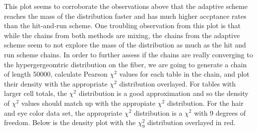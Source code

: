\documentclass{phd}\usepackage[]{graphicx}\usepackage[]{color}
\makeatletter
\newenvironment{kframe}{%
 \def\at@end@of@kframe{}%
 \ifinner\ifhmode%
  \def\at@end@of@kframe{\end{minipage}}%
  \begin{minipage}{\columnwidth}%
 \fi\fi%
 \def\FrameCommand##1{\hskip\@totalleftmargin \hskip-\fboxsep
 \colorbox{shadecolor}{##1}\hskip-\fboxsep
     \hskip-\linewidth \hskip-\@totalleftmargin \hskip\columnwidth}%
 \MakeFramed {\advance\hsize-\width
   \@totalleftmargin\z@ \linewidth\hsize
   \@setminipage}}%
 {\par\unskip\endMakeFramed%
 \at@end@of@kframe}
\newenvironment{knitrout}{}{} %
\makeatother
\begin{document}
\begin{knitrout}
\color{fgcolor}\begin{kframe}


{\ttfamily\noindent\bfseries\color{errorcolor}{\#\# Error in eval(lhs, parent, parent): object 'plot\_df2' not found}}\end{kframe}
\end{knitrout}

This plot seems to corroborate the observations above that the adaptive scheme reaches the mass of the distribution faster and has much higher accptance rates than the hit-and-run scheme. One troubling observation from this plot is that while the chains from both methods are mixing, the chains from the adaptive scheme seem to not explore the mass of the distribution as much as the hit and run scheme chains. In order to further assess if the chains are really converging to the hypergergeomtric distribution on the fiber, we are going to generate a chain of length 50000, calculate Pearson $\chi^2$ values for each table in the chain, and plot their density with the appropriate $\chi^2$ distribution overlayed. For tables with larger cell totals, the $\chi^2$ distribution is a good approximation and so the density of $\chi^2$ values should match up with the appropiate $\chi^2$ distribution. For the hair and eye color data set, the appropriate $\chi^2$ distribution is a $\chi^2$ with 9 degrees of freedom. Below is the density plot with the $\chi^2_9$ distribution overlayed in red.

\begin{knitrout}
\color{fgcolor}\begin{kframe}


{\ttfamily\noindent\bfseries\color{errorcolor}{\#\# Error in metropolis(tbl, moves, suff\_stats, A, hitAndRun = T, adaptive = T, : unused argument (hitAndRun = T)}}

{\ttfamily\noindent\bfseries\color{errorcolor}{\#\# Error in algstat:::computeX2sCpp(adapt\_chi, exp = expected): object 'adapt\_chi' not found}}

{\ttfamily\noindent\bfseries\color{errorcolor}{\#\# Error in ggplot(adapt\_stats): object 'adapt\_stats' not found}}\end{kframe}
\end{knitrout}
\end{document}
